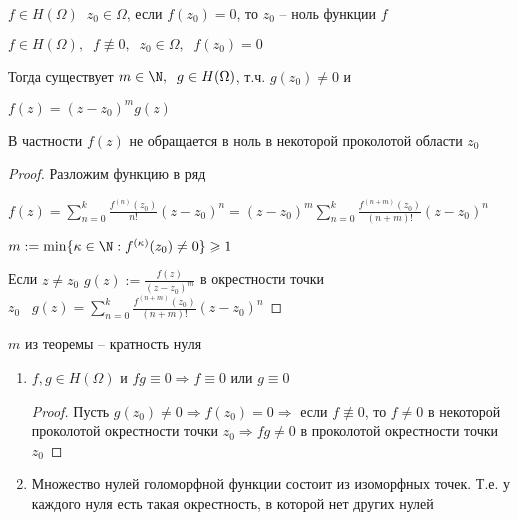 
\begin{definition}\thmslashn

	$f\in H(\Omega) \;\; z_0 \in \Omega$, если $f(z_0) = 0$, то $z_0$ -- ноль функции $f$

\end{definition}

\begin{theorem}\thmslashn
	
	$f\in H(\Omega),\;\; f\not\equiv0, \;\; z_0 \in \Omega,\;\;f(z_0) = 0$
	
	Тогда существует $m \in \N, \;\; g\in H(\Omega)$, т.ч. $g(z_0)\not = 0$ и
	
	$f(z) = (z-z_0)^mg(z)$ 
	
	В частности $f(z)$ не обращается в ноль в некоторой проколотой области $z_0$
	
\end{theorem}

\begin{proof}\thmslashn
	
	Разложим функцию в ряд
	
	$f(z) = \sum\limits_{n=0}^k \frac{f^{(n)}(z_0)}{n!}(z - z_0)^n = (z-z_0)^m \sum\limits_{n=0}^k \frac{f^{(n+m)}(z_0)}{(n+m)!}(z - z_0)^n$
	
	$m:= \min\{\kappa \in \N: f^{(\kappa)}(z_0) \not = 0 \} \geqslant 1$
	
	Если $z \not = z_0$ $g(z) := \frac{f(z)}{(z-z_0)^m}$ в окрестности точки $z_0 \;\;\; g(z) = \sum\limits_{n=0}^k \frac{f^{(n+m)}(z_0)}{(n+m)!}(z - z_0)^n$
	
\end{proof}

\begin{definition}\thmslashn
	
	$m$ из теоремы -- кратность нуля
	
\end{definition}

\begin{consequence}\thmslashn
	
	\begin{enumerate}
		\item 
		$f, g \in H(\Omega)$ и $fg\equiv 0 \Rightarrow f\equiv 0$ или $g\equiv 0$

		\begin{proof}\thmslashn
			
			Пусть $g(z_0) \not = 0  \Rightarrow f(z_0) = 0 \Rightarrow$ если $f \not\equiv 0$, то $f\not=0$ в некоторой проколотой окрестности точки $z_0 \Rightarrow fg \not= 0$ в проколотой окрестности точки $z_0$
		\end{proof}

		\item
		Множество нулей голоморфной функции состоит из изоморфных точек. Т.е. у каждого нуля есть такая окрестность, в которой нет других нулей
	\end{enumerate}

\end{consequence}

